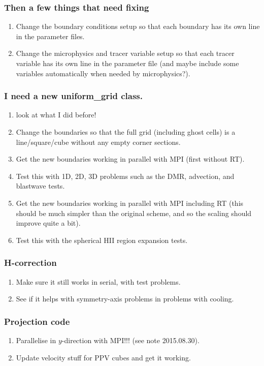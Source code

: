 \documentclass[a4paper,11pt]{article}
\begin{document}
\subsubsection{Then a few things that need fixing}
\begin{enumerate}
\item Change the boundary conditions setup so that each boundary has its own line in the parameter files.
\item Change the microphysics and tracer variable setup so that each tracer variable has its own line in the parameter file (and maybe include some variables automatically when needed by microphysics?).
\end{enumerate}

\subsubsection{I need a new uniform\_grid class.}
\begin{enumerate}
\item look at what I did before!
\item Change the boundaries so that the full grid (including ghost cells) is a line/square/cube without any empty corner sections.
\item Get the new boundaries working in parallel with MPI (first without RT).
\item Test this with 1D, 2D, 3D problems such as the DMR, advection, and blastwave tests.
\item Get the new boundaries working in parallel with MPI including RT (this should be much simpler than the original scheme, and so the scaling should improve quite a bit).
\item Test this with the spherical HII region expansion tests.
\end{enumerate}

\subsubsection{H-correction}
\begin{enumerate}
\item Make sure it still works in serial, with test problems.
\item See if it helps with symmetry-axis problems in problems with cooling.
\end{enumerate}


\subsubsection{Projection code}
\begin{enumerate}
\item Parallelise in $y$-direction with MPI!!! (see note 2015.08.30).
\item Update velocity stuff for PPV cubes and get it working.
\end{enumerate}
\end{document}
